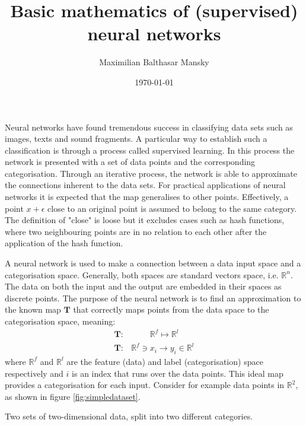 \documentclass[a4paper, justified]{tufte-handout}
\title{Basic mathematics of (supervised) neural networks}
\author{Maximilian Balthasar Mansky}
\date{\today}
\begin{document}
\maketitle

Neural networks have found tremendous success in classifying data sets such as images, texts and sound fragments. A particular way to establish such a classification is through a process called supervised learning. In this process the network is presented with a set of data points and the corresponding categorisation. Through an iterative process, the network is able to approximate the connections inherent to the data sets. For practical applications of neural networks it is expected that the map generalises to other points. Effectively, a point $x+\epsilon$ close to an original point is assumed to belong to the same category. The definition of "close" is loose but it excludes cases such as hash functions, where two neighbouring points are in no relation to each other after the application of the hash function.

A neural network is used to make a connection between a data input space and a categorisation space. Generally, both spaces are standard vectors space, i.e. $\mathbb{R}^n$. The data on both the input and the output are embedded in their spaces as discrete points. The purpose of the neural network is to find an approximation to the known map $\mathbf{T}$ that correctly maps points from the data space to the categorisation space, meaning:
\begin{align}
\mathbf{T}:&\,\phantom{\ni x_i}\mathbb{R}^f \mapsto \mathbb{R}^l\nonumber\\
\mathbf{T}:&\mathbb{R}^f \ni x_i \to y_i \in \mathbb{R}^l
\end{align}
where $\mathbb{R}^f$ and $\mathbb{R}^l$ are the feature (data) and label (categorisation) space respectively and $i$ is an index that runs over the data points. This ideal map provides a categorisation for each input. Consider for example data points in $\mathbb{R}^2$, as shown in figure \ref{fig:simpledataset}.

\begin{marginfigure}
\caption{Two sets of two-dimensional data, split into two different categories.}\label{fig:simpledataset}
\end{marginfigure}
\end{document}
